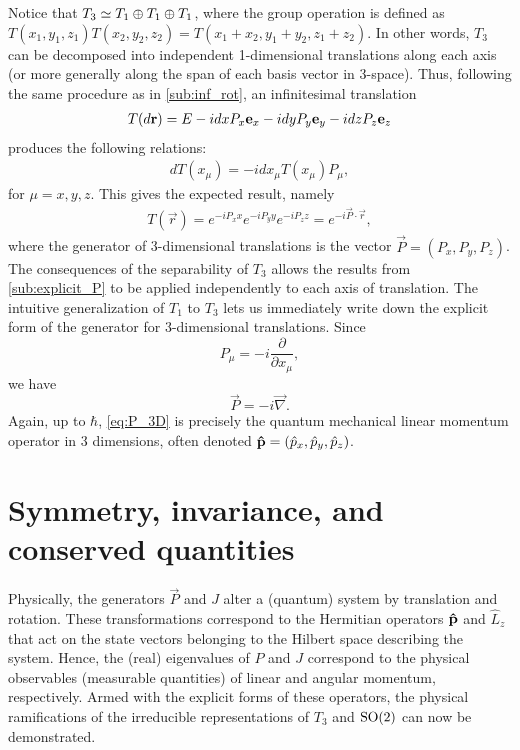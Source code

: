     Notice that $T_3\simeq T_1 \oplus T_1 \oplus T_1$, where the group operation is defined as $T(x_1,y_1,z_1)T(x_2,y_2,z_2) = T(x_1+x_2,y_1+y_2,z_1+z_2)$. In other words, $T_3$ can be decomposed into independent 1-dimensional translations along each axis (or more generally along the span of each basis vector in 3-space). Thus, following the same procedure as in \cref{sub:inf_rot}, an infinitesimal translation
    \begin{align*}
        T(d\mathbf{r}) = E - i dx P_x\mathbf{e}_x - idy P_y\mathbf{e}_y - idz P_z\mathbf{e}_z
    \end{align*}
    produces the following relations:
    \begin{align*}
        dT(x_\mu) = -idx_\mu T(x_\mu)P_\mu,
    \end{align*}
    for $\mu=x,y,z$.
    This gives the expected result, namely
    \begin{align*}
        T(\vec{r}) = e^{-iP_x x}e^{-iP_y y}e^{-iP_z z} = e^{-i\vec{P}\cdot\vec{r}},
    \end{align*}
    where the generator of 3-dimensional translations is the vector $\vec{P}=(P_x,P_y,P_z)$. The consequences of the separability of $T_3$ allows the results from \cref{sub:explicit_P} to be applied independently to each axis of translation. The intuitive generalization of $T_1$ to $T_3$ lets us immediately write down the explicit form of the generator for 3-dimensional translations. Since
    \begin{equation}
        P_\mu = -i\frac{\partial}{\partial x_\mu},
    \end{equation}
    we have
    \begin{equation}
        \vec{P} = -i\vec{\nabla}.\label{eq:P_3D}
    \end{equation}
    Again, up to $\hbar$, \cref{eq:P_3D} is precisely the quantum mechanical linear momentum operator in 3 dimensions, often denoted $\mathbf{\hat{p}}=(\hat{p}_x,\hat{p}_y,\hat{p}_z)$.


    \section{Symmetry, invariance, and conserved quantities}

    Physically, the generators $\vec{P}$ and $J$ alter a (quantum) system by translation and rotation. These transformations correspond to the Hermitian operators $\mathbf{\hat{p}}$ and $\hat{L}_z$ that act on the state vectors belonging to the Hilbert space describing the system. Hence, the (real) eigenvalues of $P$ and $J$ correspond to the physical observables (measurable quantities) of linear and angular momentum, respectively. Armed with the explicit forms of these operators, the physical ramifications of the irreducible representations of $T_3$ and $\textrm{SO}{(2)}$ can now be demonstrated.
    

